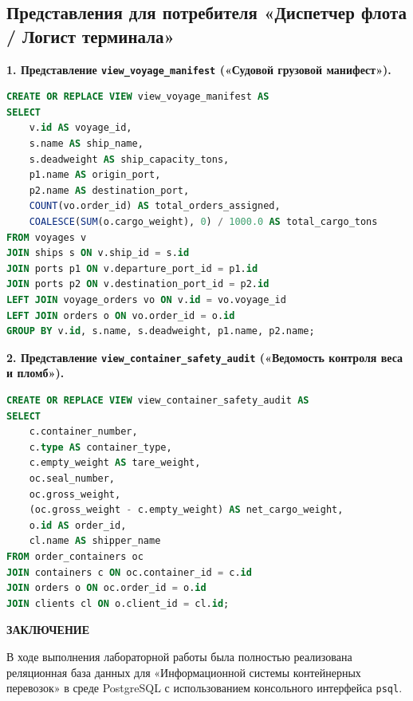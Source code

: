 \documentclass[a4paper,14pt]{article}
\begin{document}
\subsection{Представления для потребителя «Диспетчер флота / Логист терминала»}

\textbf{1. Представление \texttt{view\_voyage\_manifest} («Судовой грузовой манифест»).}
\begin{lstlisting}[language=SQL]
CREATE OR REPLACE VIEW view_voyage_manifest AS
SELECT 
    v.id AS voyage_id,
    s.name AS ship_name,
    s.deadweight AS ship_capacity_tons,
    p1.name AS origin_port,
    p2.name AS destination_port,
    COUNT(vo.order_id) AS total_orders_assigned,
    COALESCE(SUM(o.cargo_weight), 0) / 1000.0 AS total_cargo_tons
FROM voyages v
JOIN ships s ON v.ship_id = s.id
JOIN ports p1 ON v.departure_port_id = p1.id
JOIN ports p2 ON v.destination_port_id = p2.id
LEFT JOIN voyage_orders vo ON v.id = vo.voyage_id
LEFT JOIN orders o ON vo.order_id = o.id
GROUP BY v.id, s.name, s.deadweight, p1.name, p2.name;
\end{lstlisting}

\textbf{2. Представление \texttt{view\_container\_safety\_audit} («Ведомость контроля веса и пломб»).}
\begin{lstlisting}[language=SQL]
CREATE OR REPLACE VIEW view_container_safety_audit AS
SELECT 
    c.container_number,
    c.type AS container_type,
    c.empty_weight AS tare_weight,
    oc.seal_number,
    oc.gross_weight,
    (oc.gross_weight - c.empty_weight) AS net_cargo_weight,
    o.id AS order_id,
    cl.name AS shipper_name
FROM order_containers oc
JOIN containers c ON oc.container_id = c.id
JOIN orders o ON oc.order_id = o.id
JOIN clients cl ON o.client_id = cl.id;
\end{lstlisting}

\newpage
\begin{center}
    {\bfseries \MakeUppercase{Заключение}}
\end{center}

В ходе выполнения лабораторной работы была полностью реализована реляционная база данных для «Информационной системы контейнерных перевозок» в среде PostgreSQL с использованием консольного интерфейса \texttt{psql}.
\end{document}
